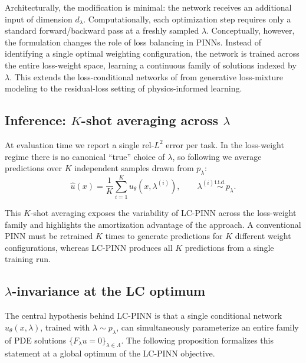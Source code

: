 \documentclass{article}
\theoremstyle{plain}
\theoremstyle{definition}
\theoremstyle{remark}
\begin{document}
Architecturally, the modification is minimal: the network receives an
additional input of dimension $d_\lambda$. Computationally, each
optimization step requires only a standard forward/backward pass at a
freshly sampled $\lambda$. Conceptually, however, the formulation
changes the role of loss balancing in PINNs. Instead of identifying a
single optimal weighting configuration, the network is trained across
the entire loss-weight space, learning a continuous family of
solutions indexed by $\lambda$. This extends the loss-conditional
networks of \citet{dosovitskiy2020} from generative loss-mixture
modeling to the residual-loss setting of physics-informed learning.

\subsection{Inference: $K$-shot averaging across $\lambda$}
\label{sec:k-shot}

At evaluation time we report a single rel-$L^2$ error per task. In the
loss-weight regime there is no canonical ``true'' choice of
$\lambda$, so following \citet{dosovitskiy2020} we average predictions
over $K$ independent samples drawn from $p_\lambda$:
\begin{equation}
   \hat u(x)
   =
   \frac{1}{K}
   \sum_{i=1}^{K}
   u_\theta(x,\lambda^{(i)}),
   \qquad
   \lambda^{(i)}
   \stackrel{\text{i.i.d.}}{\sim}
   p_\lambda .
\label{eq:k-shot}
\end{equation}

This $K$-shot averaging exposes the variability of LC-PINN across the
loss-weight family and highlights the amortization advantage of the
approach. A conventional PINN must be retrained $K$ times to generate
predictions for $K$ different weight configurations, whereas LC-PINN
produces all $K$ predictions from a single training run.


\subsection{$\lambda$-invariance at the LC optimum}
\label{sec:theorem}

The central hypothesis behind LC-PINN is that a single conditional
network $u_\theta(x,\lambda)$, trained with
$\lambda \sim p_\lambda$, can simultaneously parameterize an entire
family of PDE solutions
$\{F_\lambda u = 0\}_{\lambda \in \Lambda}$. The following proposition
formalizes this statement at a global optimum of the LC-PINN objective.
\end{document}
